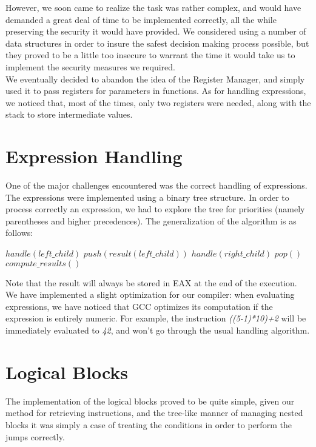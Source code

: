 \documentclass{scrartcl}
\begin{document}
However, we soon came to realize the task was rather complex, and would have demanded a great deal of time to be implemented correctly, all the while preserving the security it would have provided. We considered using a number of data structures in order to insure the safest decision making process possible, but they proved to be a little too insecure to warrant the time it would take us to implement the security measures we required.\\

We eventually decided to abandon the idea of the Register Manager, and simply used it to pass registers for parameters in functions. As for handling expressions, we noticed that, most of the times, only two registers were needed, along with the stack to store intermediate values.

\section{Expression Handling}
One of the major challenges encountered was the correct handling of expressions.
The expressions were implemented using a binary tree structure. In order to process correctly an expression, we had to explore the tree for priorities (namely parentheses and higher precedences). The generalization of the algorithm is as follows:
\vspace{0.5cm}
\begin{algorithmic}
\State $handle(left\_child)$
\State $push(result(left\_child))$
\State $handle(right\_child)$
\State $pop()$
\State $compute\_results()$
\EndIf
\end{algorithmic}
\vspace{0.5cm}
Note that the result will always be stored in EAX at the end of the execution.\\

We have implemented a slight optimization for our compiler: when evaluating expressions, we have noticed that GCC optimizes its computation if the expression is entirely numeric. For example, the instruction \emph{((5-1)*10)+2} will be immediately evaluated to \emph{42}, and won't go through the usual handling algorithm.

\section{Logical Blocks}
The implementation of the logical blocks proved to be quite simple, given our method for retrieving instructions, and the tree-like manner of managing nested blocks it was simply a case of treating the conditions in order to perform the jumps correctly.\\
\end{document}
